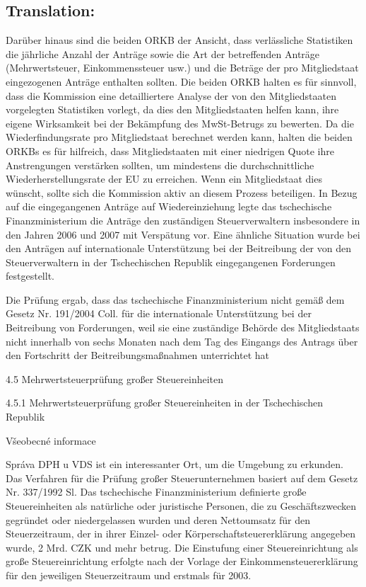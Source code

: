 \documentclass[10pt]{article}
\begin{document}
\pagebreak

\subsection*{Translation:}

Darüber hinaus sind die beiden ORKB der Ansicht, dass verlässliche Statistiken die jährliche Anzahl der Anträge sowie die Art der betreffenden Anträge (Mehrwertsteuer, Einkommenssteuer usw.) und die Beträge der pro Mitgliedstaat eingezogenen Anträge enthalten sollten.
Die beiden ORKB halten es für sinnvoll, dass die Kommission eine detailliertere Analyse der von den Mitgliedstaaten vorgelegten Statistiken vorlegt, da dies den Mitgliedstaaten helfen kann, ihre eigene Wirksamkeit bei der Bekämpfung des MwSt-Betrugs zu bewerten.
Da die Wiederfindungsrate pro Mitgliedstaat berechnet werden kann, halten die beiden ORKBs es für hilfreich, dass Mitgliedstaaten mit einer niedrigen Quote ihre Anstrengungen verstärken sollten, um mindestens die durchschnittliche Wiederherstellungsrate der EU zu erreichen.
Wenn ein Mitgliedstaat dies wünscht, sollte sich die Kommission aktiv an diesem Prozess beteiligen.
In Bezug auf die eingegangenen Anträge auf Wiedereinziehung legte das tschechische Finanzministerium die Anträge den zuständigen Steuerverwaltern insbesondere in den Jahren 2006 und 2007 mit Verspätung vor.
Eine ähnliche Situation wurde bei den Anträgen auf internationale Unterstützung bei der Beitreibung der von den Steuerverwaltern in der Tschechischen Republik eingegangenen Forderungen festgestellt.


Die Prüfung ergab, dass das tschechische Finanzministerium nicht gemäß dem Gesetz Nr. 191/2004 Coll. für die internationale Unterstützung bei der Beitreibung von Forderungen, weil sie eine zuständige Behörde des Mitgliedstaats nicht innerhalb von sechs Monaten nach dem Tag des Eingangs des Antrags über den Fortschritt der Beitreibungsmaßnahmen unterrichtet hat



4.5 Mehrwertsteuerprüfung großer Steuereinheiten



4.5.1 Mehrwertsteuerprüfung großer Steuereinheiten in der Tschechischen Republik



Všeobecné informace

Správa DPH u VDS ist ein interessanter Ort, um die Umgebung zu erkunden.
Das Verfahren für die Prüfung großer Steuerunternehmen basiert auf dem Gesetz Nr. 337/1992 Sl.
Das tschechische Finanzministerium definierte große Steuereinheiten als natürliche oder juristische Personen, die zu Geschäftszwecken gegründet oder niedergelassen wurden und deren Nettoumsatz für den Steuerzeitraum, der in ihrer Einzel- oder Körperschaftsteuererklärung angegeben wurde, 2 Mrd. CZK und mehr betrug.
Die Einstufung einer Steuereinrichtung als große Steuereinrichtung erfolgte nach der Vorlage der Einkommensteuererklärung für den jeweiligen Steuerzeitraum und erstmals für 2003.
\end{document}
